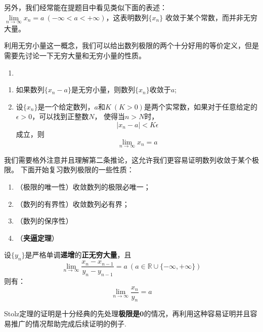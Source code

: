	另外，我们经常能在提题目中看见类似下面的表述：$\lim\limits_{n\rightarrow\infty}x_n=a\ (-\infty<a<+\infty)$，这表明数列$\{x_n\}$
	收敛于某个常数，而并非无穷大量。\par
	利用无穷小量这一概念，我们可以给出数列极限的两个十分好用的等价定义，但是需要先讨论一下无穷大量和无穷小量的性质。
	\begin{property}[无穷大量和无穷小量的性质]
		\begin{enumerate}
            \item 
        \end{enumerate}
	\end{property}
	\begin{corollary}[数列极限的等价定义]
		\begin{enumerate}
			\item 如果数列$\{x_n-a\}$是无穷小量，则数列$\{x_n\}$收敛于$a$;
			\item 设$\{x_n\}$是一个给定数列，$a$和$K\ (K>0)$是两个实常数，如果对于任意给定的$\epsilon>0$，可以找到正整数$N$，
			使得当$n>N$时，$$|x_n-a|<K\epsilon$$成立，则$$\lim\limits_{n\rightarrow\infty}x_n=a$$
		\end{enumerate}
	\end{corollary}

	我们需要格外注意并且理解第二条推论，这允许我们更容易证明数列收敛于某个极限。
	下面开始复习数列极限的一些性质：
	\begin{property}[数列极限的性质]
		\begin{enumerate}
			\item （极限的唯一性）收敛数列的极限必唯一；
			\item （数列的有界性）收敛数列必有界；
			\item （数列的保序性）
			\item （\textbf{夹逼定理}）
		\end{enumerate}
	\end{property}
	\begin{property}
		
	\end{property}
	
	\begin{theorem}[Stolz定理]
		设$\{y_n\}$是严格单调\textbf{递增}的\textbf{正无穷大量}，且$$\lim\limits_{n\rightarrow\infty}\frac{x_{n}-x_{n-1}}{y_{n}-y_{n-1}}=a\ (a\in\mathbb{R}\cup\{-\infty,+\infty\})$$
		则有：$$\lim\limits_{n\rightarrow\infty}\frac{x_n}{y_n}=a$$
	\end{theorem}

	Stolz定理的证明是十分经典的先处理\textbf{极限是}$\bm{0}$的情况，再利用这种容易证明并且容易推广的情况帮助完成后续证明的例子.

